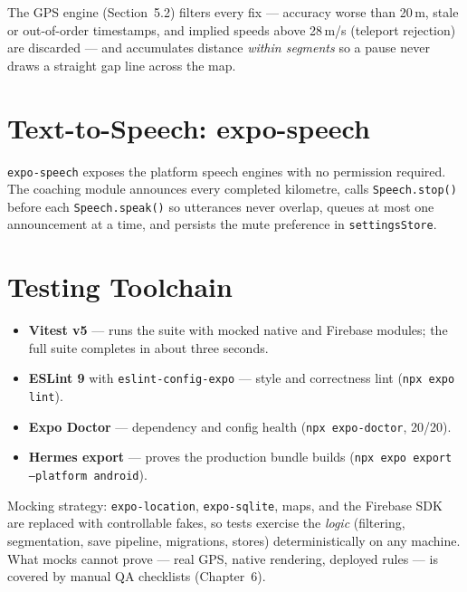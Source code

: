 \documentclass[12pt, a4paper]{report}
\newcommand{\pkg}[1]{\texttt{#1}}
\newcommand{\code}[1]{\texttt{#1}}
\begin{document}
\noindent The GPS engine (Section~5.2) filters every fix --- accuracy worse
than 20\,m, stale or out-of-order timestamps, and implied speeds above
28\,m/s (teleport rejection) are discarded --- and accumulates distance
\emph{within segments} so a pause never draws a straight gap line across the
map.

\section{Text-to-Speech: expo-speech}
\pkg{expo-speech} exposes the platform speech engines with no permission
required. The coaching module announces every completed kilometre, calls
\code{Speech.stop()} before each \code{Speech.speak()} so utterances never
overlap, queues at most one announcement at a time, and persists the mute
preference in \code{settingsStore}.

\section{Testing Toolchain}
\begin{itemize}[leftmargin=1.2cm]
  \item \textbf{Vitest v5} --- runs the suite with mocked native and Firebase
        modules; the full suite completes in about three seconds.
  \item \textbf{ESLint 9} with \code{eslint-config-expo} --- style and
        correctness lint (\code{npx expo lint}).
  \item \textbf{Expo Doctor} --- dependency and config health
        (\code{npx expo-doctor}, 20/20).
  \item \textbf{Hermes export} --- proves the production bundle builds
        (\code{npx expo export --platform android}).
\end{itemize}

\noindent Mocking strategy: \pkg{expo-location}, \pkg{expo-sqlite}, maps, and
the Firebase SDK are replaced with controllable fakes, so tests exercise the
\emph{logic} (filtering, segmentation, save pipeline, migrations, stores)
deterministically on any machine. What mocks cannot prove --- real GPS,
native rendering, deployed rules --- is covered by manual QA checklists
(Chapter~6).
\end{document}
